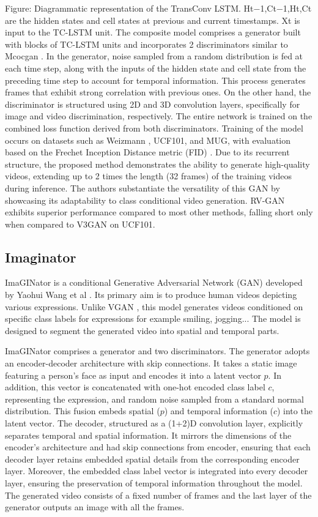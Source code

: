 \documentclass[12pt,twoside,a4paper,parskip]{scrbook} %
\begin{document}
Figure: Diagrammatic representation of the TransConv LSTM. Ht−1,Ct−1,Ht,Ct are the hidden states and cell states at previous and current timestamps. Xt is input to the TC-LSTM unit.
The composite model comprises a generator built with blocks of TC-LSTM units and incorporates 2 discriminators similar to Mcocgan \cite{10_mocogan}. In the generator, noise sampled from a random distribution is fed at each time step, along with the inputs of the hidden state and cell state from the preceding time step to account for temporal information. This process generates frames that exhibit strong correlation with previous ones. On the other hand, the discriminator is structured using 2D and 3D convolution layers, specifically for image and video discrimination, respectively. The entire network is trained on the combined loss function derived from both discriminators.
Training of the model occurs on datasets such as Weizmann \cite{weizmann}, UCF101\cite{UCF}, and MUG\cite{13_MUG}, with evaluation based on the Frechet Inception Distance metric (FID) \cite{fid}. Due to its recurrent structure, the proposed method demonstrates the ability to generate high-quality videos, extending up to 2 times the length (32 frames) of the training videos during inference. The authors substantiate the versatility of this GAN by showcasing its adaptability to class conditional video generation. RV-GAN exhibits superior performance compared to most other methods, falling short only when compared to V3GAN\cite{v3gan} on UCF101.

\subsection{Imaginator}
ImaGINator is a conditional Generative Adversarial Network (GAN) developed by Yaohui Wang et al \cite{9_imaginator}. Its primary aim is to produce human videos depicting various expressions. Unlike VGAN \cite{8_Vgan}, this model generates videos conditioned on specific class labels for expressions for example smiling, jogging... The model is designed to segment the generated video into spatial and temporal parts.

ImaGINator comprises a generator and two discriminators. The generator adopts an encoder-decoder architecture with skip connections. It takes a static image featuring a person's face as input and encodes it into a latent vector $p$.  In addition, this vector is concatenated with one-hot encoded class label $c$, representing the expression, and random noise sampled from a standard normal distribution. This fusion embeds spatial ($p$) and temporal information ($c$) into the latent vector. The decoder, structured as a (1+2)D convolution layer, explicitly separates temporal and spatial information. It mirrors the dimensions of the encoder's architecture and had skip connections from encoder, ensuring that each decoder layer retains embedded spatial details from the corresponding encoder layer. Moreover, the embedded class label vector is integrated into every decoder layer, ensuring the preservation of temporal information throughout the model. The generated video consists of a fixed number of frames and the last layer of the generator outputs an image with all the frames.  
\end{document}
